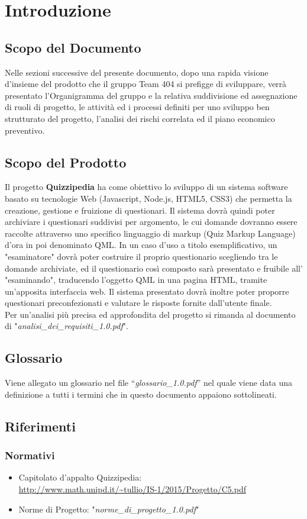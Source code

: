 \documentclass[a4paper,11pt]{article}
\begin{document}
	\newpage
	\section{Introduzione}
	\subsection{Scopo del Documento}
	Nelle sezioni successive del presente documento, dopo una rapida visione d'insieme del prodotto che il gruppo Team 404 si prefigge di sviluppare, verrà presentato l'Organigramma del gruppo e la relativa suddivisione ed assegnazione di ruoli di progetto, le attività ed i processi definiti per uno sviluppo ben strutturato del progetto, l'analisi dei rischi correlata ed il piano economico preventivo.
	\subsection{Scopo del Prodotto}
	Il progetto \textbf{Quizzipedia} ha come obiettivo lo sviluppo di un sistema software basato su tecnologie Web (Javascript, Node.js, HTML5, CSS3) che permetta la creazione, gestione e fruizione di questionari. Il sistema dovrà quindi poter archiviare i questionari suddivisi per argomento, le cui domande dovranno essere raccolte attraverso uno specifico linguaggio di markup (Quiz Markup Language) d'ora in poi denominato QML. In un caso d'uso a titolo esemplificativo, un "esaminatore" dovrà poter costruire il proprio questionario scegliendo tra le domande archiviate, ed il questionario così composto sarà presentato e fruibile all' "esaminando", traducendo l'oggetto QML in una pagina HTML, tramite un'apposita interfaccia web. Il sistema presentato dovrà inoltre poter proporre questionari preconfezionati e valutare le risposte fornite dall'utente finale.
	\\
	Per un'analisi più precisa ed approfondita del progetto si rimanda al documento di "\textit{analisi\_dei\_requisiti\_1.0.pdf}".
	\subsection{Glossario}
	Viene allegato un glossario nel file ``\textit{glossario\_1.0.pdf}'' nel quale viene data una definizione a tutti i termini che in questo documento appaiono sottolineati.
	\subsection{Riferimenti}
		\subsubsection{Normativi}
		\begin{itemize}
			\item Capitolato d'appalto Quizzipedia:\\
			\url{http://www.math.unipd.it/~tullio/IS-1/2015/Progetto/C5.pdf}
			\item Norme di Progetto: "\textit{norme\_di\_progetto\_1.0.pdf}"
		\end{itemize}
\end{document}

